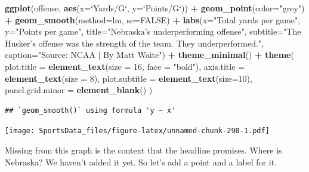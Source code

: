 \documentclass[
]{book}
\newenvironment{Shaded}{\begin{snugshade}}{\end{snugshade}}
\newcommand{\DataTypeTok}[1]{\textcolor[rgb]{0.13,0.29,0.53}{#1}}
\newcommand{\DecValTok}[1]{\textcolor[rgb]{0.00,0.00,0.81}{#1}}
\newcommand{\KeywordTok}[1]{\textcolor[rgb]{0.13,0.29,0.53}{\textbf{#1}}}
\newcommand{\NormalTok}[1]{#1}
\newcommand{\OperatorTok}[1]{\textcolor[rgb]{0.81,0.36,0.00}{\textbf{#1}}}
\newcommand{\OtherTok}[1]{\textcolor[rgb]{0.56,0.35,0.01}{#1}}
\newcommand{\StringTok}[1]{\textcolor[rgb]{0.31,0.60,0.02}{#1}}
\begin{document}
\begin{Shaded}
\begin{Highlighting}[]
\KeywordTok{ggplot}\NormalTok{(offense, }\KeywordTok{aes}\NormalTok{(}\DataTypeTok{x=}\StringTok{`}\DataTypeTok{Yards/G}\StringTok{`}\NormalTok{, }\DataTypeTok{y=}\StringTok{`}\DataTypeTok{Points/G}\StringTok{`}\NormalTok{)) }\OperatorTok{+}\StringTok{ }
\StringTok{  }\KeywordTok{geom_point}\NormalTok{(}\DataTypeTok{color=}\StringTok{"grey"}\NormalTok{) }\OperatorTok{+}\StringTok{ }\KeywordTok{geom_smooth}\NormalTok{(}\DataTypeTok{method=}\NormalTok{lm, }\DataTypeTok{se=}\OtherTok{FALSE}\NormalTok{) }\OperatorTok{+}\StringTok{ }
\StringTok{  }\KeywordTok{labs}\NormalTok{(}\DataTypeTok{x=}\StringTok{"Total yards per game"}\NormalTok{, }\DataTypeTok{y=}\StringTok{"Points per game"}\NormalTok{, }\DataTypeTok{title=}\StringTok{"Nebraska's underperforming offense"}\NormalTok{, }\DataTypeTok{subtitle=}\StringTok{"The Husker's offense was the strength of the team. They underperformed."}\NormalTok{, }\DataTypeTok{caption=}\StringTok{"Source: NCAA | By Matt Waite"}\NormalTok{) }\OperatorTok{+}\StringTok{ }
\StringTok{  }\KeywordTok{theme_minimal}\NormalTok{() }\OperatorTok{+}\StringTok{ }
\StringTok{  }\KeywordTok{theme}\NormalTok{(}
    \DataTypeTok{plot.title =} \KeywordTok{element_text}\NormalTok{(}\DataTypeTok{size =} \DecValTok{16}\NormalTok{, }\DataTypeTok{face =} \StringTok{"bold"}\NormalTok{),}
    \DataTypeTok{axis.title =} \KeywordTok{element_text}\NormalTok{(}\DataTypeTok{size =} \DecValTok{8}\NormalTok{), }
    \DataTypeTok{plot.subtitle =} \KeywordTok{element_text}\NormalTok{(}\DataTypeTok{size=}\DecValTok{10}\NormalTok{), }
    \DataTypeTok{panel.grid.minor =} \KeywordTok{element_blank}\NormalTok{()}
\NormalTok{    ) }
\end{Highlighting}
\end{Shaded}

\begin{verbatim}
## `geom_smooth()` using formula 'y ~ x'
\end{verbatim}

\texttt{[image: SportsData\_files/figure-latex/unnamed-chunk-290-1.pdf]}

Missing from this graph is the context that the headline promises. Where is Nebraska? We haven't added it yet. So let's add a point and a label for it.
\end{document}
